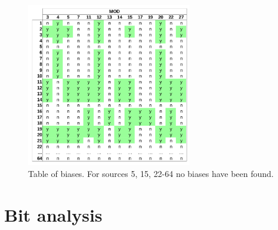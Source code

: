 \begin{figure}[H]
\centering
\includegraphics[width=0.64\textwidth]{tex/images/mod_analysis}
\caption{Table of biases. For sources 5, 15, 22-64 no biases have been found.}

\end{figure}

\section{Bit analysis}
\label{appendix-bit-analysis}